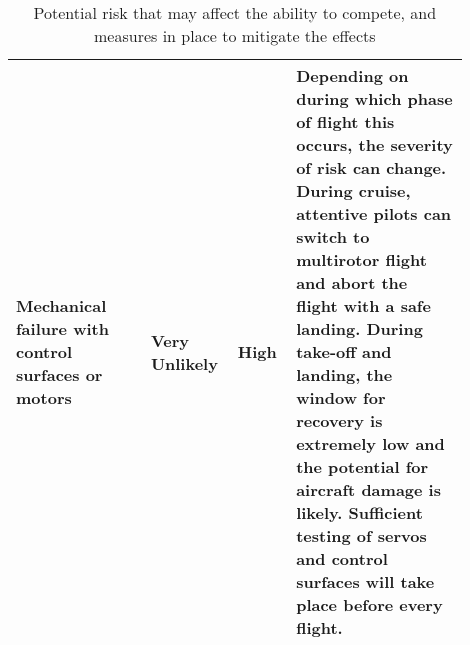 \begin{table}[htpb]
\begin{tabular}{p{0.28\linewidth}  p{0.14\linewidth}  p{0.12\linewidth}
		 p{0.36\linewidth} }
		Mechanical failure with control surfaces or motors &
		Very Unlikely & High &
		Depending on during which phase of flight this occurs, the
		severity of risk can change. During cruise, attentive pilots can
		switch to multirotor flight and abort the flight with a safe landing.
		During take-off and landing, the window for recovery is extremely low
		and the potential for aircraft damage is likely. Sufficient testing of
		servos and control surfaces will take place before every flight. \\
		\midrule

	\end{tabular}
	\caption{Potential risk that may affect the ability to compete, and
	measures in place to mitigate the effects}
\end{table}

